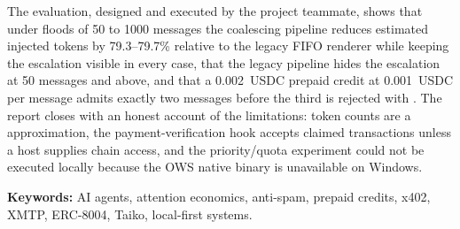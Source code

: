 The evaluation, designed and executed by the project teammate, shows that under floods
of 50 to 1000 messages the coalescing pipeline reduces estimated injected tokens by
79.3--79.7\% relative to the legacy FIFO renderer while keeping the escalation visible in
every case, that the legacy pipeline hides the escalation at 50 messages and above, and that
a 0.002~USDC prepaid credit at 0.001~USDC per message admits exactly two messages before
the third is rejected with . The report closes with an honest
account of the limitations: token counts are a  approximation, the
payment-verification hook accepts claimed transactions unless a host supplies chain
access, and the priority/quota experiment could not be executed locally because the OWS
native binary is unavailable on Windows.

\medskip
\noindent\textbf{Keywords:} AI agents, attention economics, anti-spam, prepaid credits,
x402, XMTP, ERC-8004, Taiko, local-first systems.
